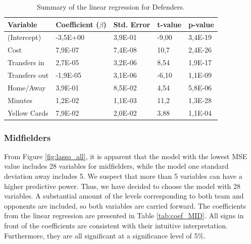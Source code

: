 \begin{table}[H]
\centering
\begin{tabular}{|l|l|l|l|l|}
\hline
Variable      & Coefficient ($\beta$) & Std. Error & t-value & p-value \\ \hline
(Intercept)   & -3,5E+00     & 3,9E-01    & -9,00    & 3,4E-19 \\
Cost          & 7,9E-07      & 7,4E-08    & 10,7    & 2,4E-26 \\
Transfers in  & 2,7E-05      & 3,2E-06    & 8,54     & 1,9E-17 \\
Transfers out & -1,9E-05     & 3,1E-06    & -6,10    & 1,1E-09 \\
Home/Away     & 3,9E-01      & 8,5E-02    & 4,54     & 5,8E-06 \\
Minutes       & 1,2E-02      & 1,1E-03    & 11,2    & 1,3E-28 \\
Yellow Cards  & 7,9E-02      & 2,0E-02    & 3,88     & 1,1E-04 \\
\hline
\end{tabular}
\caption{Summary of the linear regression for Defenders.}
\label{tab:coef_DEF}
\end{table}


\subsubsection{Midfielders}
From Figure \ref{fig:lasso_all}, it is apparent that the model with the lowest MSE value includes 28 variables for midfielders, while the model one standard deviation away includes 5. We suspect that more than 5 variables can have a higher predictive power. Thus, we have decided to choose the model with 28 variables. A substantial amount of the levels corresponding to both team and opponents are included, so both variables are carried forward. The coefficients from the linear regression are presented in Table \ref{tab:coef_MID}. All signs in front of the coefficients are consistent with their intuitive interpretation. Furthermore, they are all significant at a significance level of 5\%.

